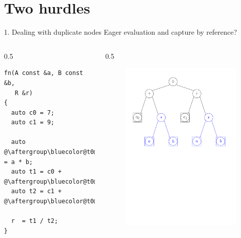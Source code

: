 \documentclass[xcolor=dvipsnames]{beamer}
\begin{document}
\section{Two hurdles}

\begin{frame}[fragile]{1. Dealing with duplicate nodes}
Eager evaluation and capture by reference?
  \begin{columns}[T] %
    \begin{column}{0.5\textwidth}
        \begin{lstlisting}
fn(A const &a, B const &b,
   R &r)
{
  auto c0 = 7;
  auto c1 = 9;

  auto @\aftergroup\bluecolor@t0@\aftergroup\blackcolor@ = a * b;
  auto t1 = c0 + @\aftergroup\bluecolor@t0@\aftergroup\blackcolor@;
  auto t2 = c1 + @\aftergroup\bluecolor@t0@\aftergroup\blackcolor@;

  r  = t1 / t2;
}
  \end{lstlisting}
    \end{column}%
    \hfill%
    \begin{column}{0.5\textwidth}
\begin{figure}[H]
 \centering
 \includegraphics[width=0.99\textwidth]{fig_exprtree_dup}
\end{figure}
    \end{column}%
  \end{columns}
\end{frame}
\end{document}

